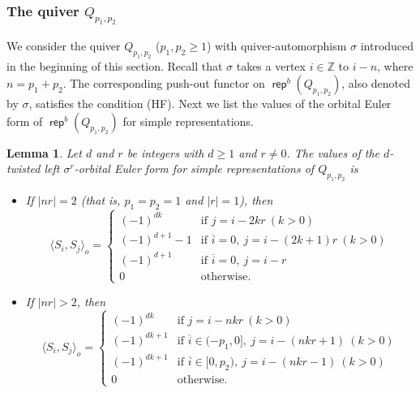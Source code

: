 \documentclass[reqno,12pt,a4paper]{amsart}
\newtheorem{lemma}[theorem]{Lemma}
\theoremstyle{remark}
\theoremstyle{definition}
\newcommand{\opname}[1]{\operatorname{\mathsf{#1}}}
\newcommand{\rep}{\opname{rep}\nolimits}
\numberwithin{equation}{section}
\begin{document}
\subsubsection{The quiver $Q_{p_1,p_2}$}
\label{ss:orbit-Euler-form-zigzag}

We consider the quiver $Q_{p_1,p_2}$ ($p_1,p_2\geq 1$) with quiver-automorphism $\sigma$ introduced in the beginning of this section. Recall that $\sigma$ takes a vertex $i\in\mathbb{Z}$ to $i-n$, where $n=p_1+p_2$. The corresponding push-out functor on $\rep^b(Q_{p_1,p_2})$, also denoted by $\sigma$, satisfies the condition (HF). Next we list the values of the orbital Euler form of $\rep^b(Q_{p_1,p_2})$ for simple representations.

\begin{lemma}
\label{lem:orbital-Euler-form-zigzag}
Let $d$ and $r$ be integers with $d\geq 1$ and $r\neq 0$.
The values of the $d$-twisted left $\sigma^r$-orbital Euler form for simple representations of $Q_{p_1,p_2}$ is
\begin{itemize}
\item[(1)] If $|nr|=2$ (that is, $p_1=p_2=1$ and $|r|=1$), then
    \[
    \langle S_i,S_j\rangle_o=\begin{cases}
    (-1)^{dk} & \text{if }j=i-2kr~(k>0)\\
    (-1)^{d+1}-1 & \text{if } \overline{i}=0,~j=i-(2k+1)r~(k>0)\\
    (-1)^{d+1}& \text{if } \overline{i}=0,~j=i-r\\
    0 & \text{otherwise}.
    \end{cases}
    \]
\item[(2)] If $|nr|>2$, then
    \[
    \langle S_i,S_j\rangle_o=\begin{cases}
    (-1)^{dk} & \text{if }j=i-nkr~(k>0)\\
    (-1)^{dk+1} & \text{if } \overline{i}\in(-p_1,0],~j=i-(nkr+1)~(k>0)\\
    (-1)^{dk+1} & \text{if } \overline{i}\in [0,p_2),~j=i-(nkr-1)~(k>0)\\
    0 & \text{otherwise}.
    \end{cases}
    \]
\end{itemize}
\end{lemma}
\end{document}
